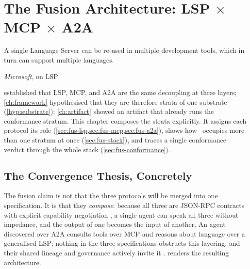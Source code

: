 \chapter{The Fusion Architecture: LSP \texorpdfstring{$\times$}{x} MCP \texorpdfstring{$\times$}{x} A2A}
\label{ch:fusion}

\epigraph{A single Language Server can be re-used in multiple development tools,
which in turn can support multiple languages.}{\textit{Microsoft}, on LSP
\citep{lsp-official}}

 established that LSP, MCP, and A2A are the same decoupling at
three layers; \cref{ch:framework} hypothesised that they are therefore strata of
one substrate (\cref{hyp:substrate}); \cref{ch:artifact} showed an artifact that
already runs the conformance stratum. This chapter composes the strata explicitly.
It assigns each protocol its role (\cref{sec:fus-lsp,sec:fus-mcp,sec:fus-a2a}),
shows how \lspmax\ occupies more than one stratum at once (\cref{sec:fus-stack}),
and traces a single conformance verdict through the whole stack
(\cref{sec:fus-conformance}).

\section{The Convergence Thesis, Concretely}
\label{sec:fus-convergence}

The fusion claim is not that the three protocols will be merged into one
specification. It is that they \emph{compose}: because all three are JSON-RPC
contracts with explicit capability negotiation
\citep{lsp-spec-318,mcp-spec-2025,a2a-spec}, a single agent can speak all three
without impedance, and the output of one becomes the input of another. An agent
discovered over A2A consults tools over MCP and reasons about language over a
generalised LSP; nothing in the three specifications obstructs this layering, and
their shared lineage and governance actively invite it
\citep{mcp-spec-2025,a2a-mcp,lf-aaif-press}.  renders the
resulting architecture.

